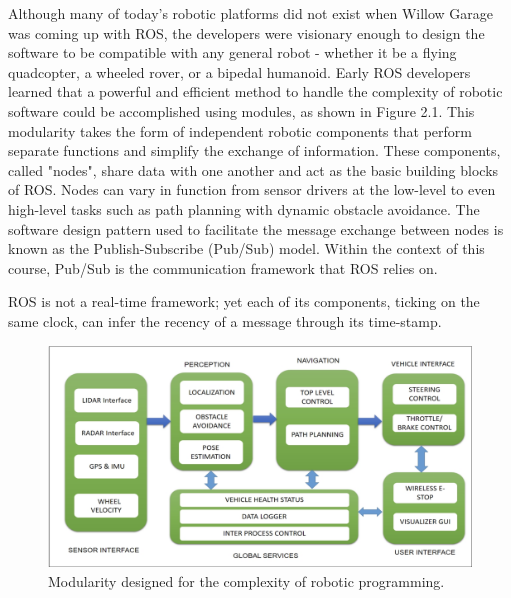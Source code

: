\documentclass[twoside]{article}
\begin{document}
Although many of today's robotic platforms did not exist when Willow Garage was coming up with ROS, the developers were visionary enough to design the software to be compatible with any general robot - whether it be a flying quadcopter, a wheeled rover, or a bipedal humanoid. Early ROS developers learned that a powerful and efficient method to handle the complexity of robotic software could be accomplished using modules, as shown in Figure 2.1. This modularity takes the form of independent robotic components that perform separate functions and simplify the exchange of information. These components, called "nodes", share data with one another and act as the basic building blocks of ROS. Nodes can vary in function from sensor drivers at the low-level to even high-level tasks such as path planning with dynamic obstacle avoidance. The software design pattern used to facilitate the message exchange between nodes is known as the Publish-Subscribe (Pub/Sub) model. Within the context of this course, Pub/Sub is the communication framework that ROS relies on.

ROS is not a real-time framework; yet each of its components, ticking on the same clock, can infer the recency of a message through its time-stamp.
\begin{figure}[ht]
\centering
\includegraphics[width=1\textwidth]{ModularityPhoto}
\caption{Modularity designed for the complexity of robotic programming.}
\end{figure}
\end{document}
